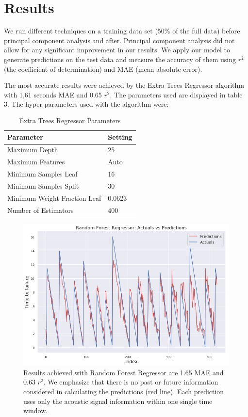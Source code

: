 \documentclass[]{llncs} %
\begin{document}
\section{Results}
We run different techniques on a training data set (50\% of the full data) before principal component analysis and after. Principal component analysis did not allow for any significant improvement in our results. We apply our model to generate predictions on the test data  and measure the accuracy of them using $r^2$ (the coefficient of determination) and MAE (mean absolute error). \par 

The most accurate results were achieved by the Extra Trees Regressor algorithm with 1,61 seconds MAE and 0.65 $r^2$. The parameters used are displayed in table 3. %
The hyper-parameters used with the algorithm  were:

\begin{table}
	\begin{center}
		\caption{Extra Trees Regressor Parameters}
		\label{tab:hyperparameters}
		\begin{tabular}{l|l} 
			\textbf{Parameter} & \textbf{Setting}\\
			\hline
			Maximum Depth & 25 \\ 
			Maximum Features & Auto \\ 
			Minimum Samples Leaf & 16 \\ 
			Minimum Samples Split & 30 \\ 
			Minimum Weight Fraction Leaf & 0.0623 \\
			Number of Estimators & 400 \\
		\end{tabular}
	\end{center}
\end{table}

\par

\begin{figure}
	\centering
	\includegraphics[width=.9\linewidth]{results1}
	\caption{Results achieved with Random Forest Regressor are 1.65 MAE and 0.63 $r^2$. We emphasize that there is no past or future information considered in calculating the predictions (red line). Each prediction uses only the acoustic signal information within one single time window.}
	\label{fig:results1}
\end{figure}
\end{document}
